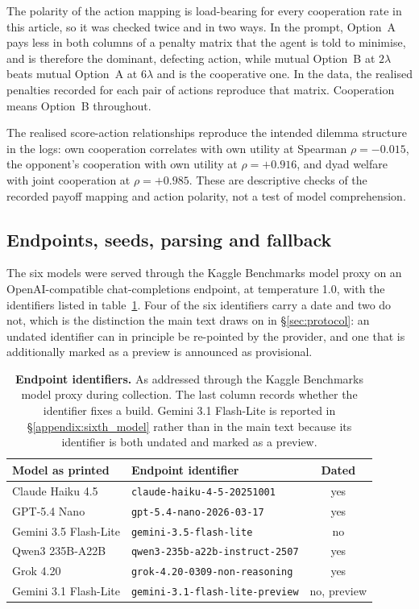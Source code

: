 \documentclass[11pt,a4paper]{article}
\newcommand{\lam}{\lambda}
\begin{document}
The polarity of the action mapping is load-bearing for every cooperation rate
in this article, so it was checked twice and in two ways. In the prompt,
Option~A pays less in both columns of a penalty matrix that the agent is told
to minimise, and is therefore the dominant, defecting action, while mutual
Option~B at $2\lam$ beats mutual Option~A at $6\lam$ and is the cooperative
one. In the data, the realised penalties recorded for each pair of actions
reproduce that matrix. Cooperation means Option~B throughout.

The realised score-action relationships reproduce the intended dilemma
structure in the logs: own cooperation correlates with own utility at Spearman
$\rho = -0.015$, the opponent's cooperation with own utility at $\rho = +0.916$,
and dyad welfare with joint cooperation at $\rho = +0.985$. These are
descriptive checks of the recorded payoff mapping and action polarity, not a
test of model comprehension.

\subsection{Endpoints, seeds, parsing and fallback}\label{appendix:endpoints}

The six models were served through the Kaggle Benchmarks model proxy on an
OpenAI-compatible chat-completions endpoint, at temperature 1.0, with the
identifiers listed in table~\ref{tab:A-endpoints}. Four of the six identifiers
carry a date and two do not, which is the distinction the main text draws on in
\S\ref{sec:protocol}: an undated identifier can in principle be re-pointed by
the provider, and one that is additionally marked as a preview is announced as
provisional.

\begin{table}[htbp]
\centering
\footnotesize
\caption{\textbf{Endpoint identifiers.} As addressed through the Kaggle
Benchmarks model proxy during collection. The last column records whether the
identifier fixes a build. Gemini 3.1 Flash-Lite is reported in
\S\ref{appendix:sixth_model} rather than in the main text because its
identifier is both undated and marked as a preview.}
\label{tab:A-endpoints}
\begin{tabular}{@{}llc@{}}
\toprule
Model as printed & Endpoint identifier & Dated \\
\midrule
Claude Haiku 4.5      & \texttt{claude-haiku-4-5-20251001}      & yes \\
GPT-5.4 Nano          & \texttt{gpt-5.4-nano-2026-03-17}        & yes \\
Gemini 3.5 Flash-Lite & \texttt{gemini-3.5-flash-lite}          & no  \\
Qwen3 235B-A22B       & \texttt{qwen3-235b-a22b-instruct-2507}  & yes \\
Grok 4.20             & \texttt{grok-4.20-0309-non-reasoning}   & yes \\
Gemini 3.1 Flash-Lite & \texttt{gemini-3.1-flash-lite-preview}  & no, preview \\
\bottomrule
\end{tabular}
\end{table}
\end{document}
